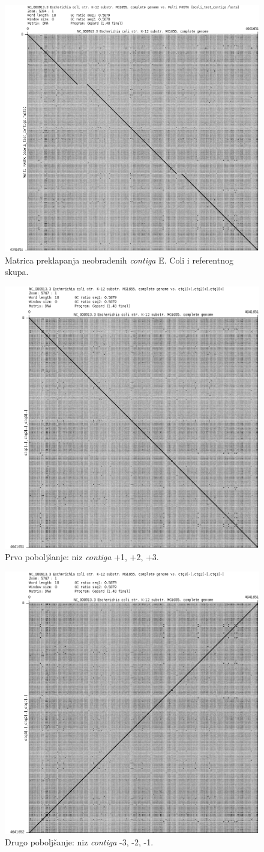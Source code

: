 \documentclass[times, utf8, seminar, numeric]{fer}
\begin{document}
\begin{figure}[h]
	\centering
	\centerline{\includegraphics[width=0.6\linewidth]{img/ec_contigs}}
	\caption{Matrica preklapanja neobrađenih \textit{contiga} E. Coli i referentnog skupa.}
	\label{fig:eccontigs}
\end{figure}

\begin{figure}[h]
	\centering
	\centerline{\includegraphics[width=0.6\linewidth]{img/ec_1_2_3}}
	\caption{Prvo poboljšanje: niz \textit{contiga} +1, +2, +3.}
	\label{fig:ec123}
\end{figure}

\begin{figure}[h]
	\centering
	\centerline{\includegraphics[width=0.6\linewidth]{img/ec_3_2_1_neg}}
	\caption{Drugo poboljšanje: niz \textit{contiga} -3, -2, -1.}
	\label{fig:ec321neg}
\end{figure}
\end{document}
